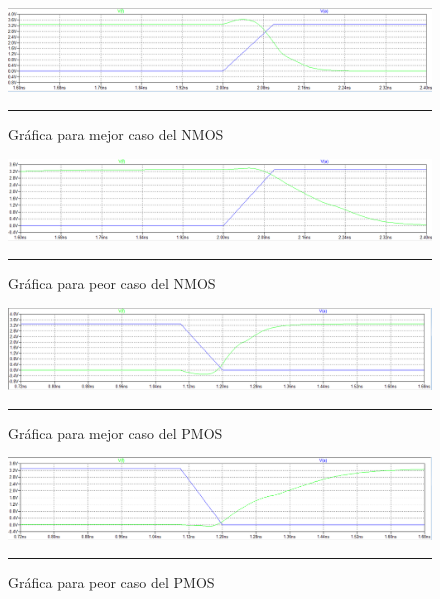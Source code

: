 \documentclass[12pt,a4paper]{article} %
\begin{document}
\begin{figure}[htbp]
\begin{center}
    \includegraphics[scale=0.5]{./Mejor_caso_red_nmos.png}
    \rule{35em}{0.5pt}
  \caption[Captura]{Gráfica para mejor caso del NMOS}
  \label{fig:M_nmos}
  \end{center}
\end{figure}

\begin{figure}[htbp]
\begin{center}
    \includegraphics[scale=0.5]{./Peor_caso_red_nmos.png}
    \rule{35em}{0.5pt}
  \caption[Captura]{Gráfica para peor caso del NMOS}
  \label{fig:P_nmos}
  \end{center}
\end{figure}

\begin{figure}[htbp]
\begin{center}
    \includegraphics[scale=0.5]{./Mejor_caso_red_pmos.png}
    \rule{35em}{0.5pt}
  \caption[Captura]{Gráfica para mejor caso del PMOS}
  \label{fig:M_pmos}
  \end{center}
\end{figure}


\begin{figure}[htbp]
\begin{center}
    \includegraphics[scale=0.5]{./Peor_caso_red_pmos.png}
    \rule{35em}{0.5pt}
  \caption[Captura]{Gráfica para peor caso del PMOS}
  \label{fig:P_pmos}
  \end{center}
\end{figure}
\end{document}
